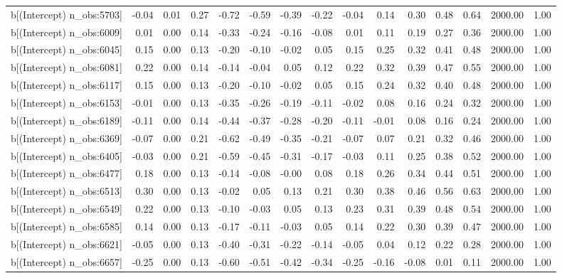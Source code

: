 \begin{table}[ht]
\begin{tabular}{rrrrrrrrrrrrrrr}
  b[(Intercept) n\_obs:5703] & -0.04 & 0.01 & 0.27 & -0.72 & -0.59 & -0.39 & -0.22 & -0.04 & 0.14 & 0.30 & 0.48 & 0.64 & 2000.00 & 1.00 \\ 
  b[(Intercept) n\_obs:6009] & 0.01 & 0.00 & 0.14 & -0.33 & -0.24 & -0.16 & -0.08 & 0.01 & 0.11 & 0.19 & 0.27 & 0.36 & 2000.00 & 1.00 \\ 
  b[(Intercept) n\_obs:6045] & 0.15 & 0.00 & 0.13 & -0.20 & -0.10 & -0.02 & 0.05 & 0.15 & 0.25 & 0.32 & 0.41 & 0.48 & 2000.00 & 1.00 \\ 
  b[(Intercept) n\_obs:6081] & 0.22 & 0.00 & 0.14 & -0.14 & -0.04 & 0.05 & 0.12 & 0.22 & 0.32 & 0.39 & 0.47 & 0.55 & 2000.00 & 1.00 \\ 
  b[(Intercept) n\_obs:6117] & 0.15 & 0.00 & 0.13 & -0.20 & -0.10 & -0.02 & 0.05 & 0.15 & 0.24 & 0.32 & 0.40 & 0.48 & 2000.00 & 1.00 \\ 
  b[(Intercept) n\_obs:6153] & -0.01 & 0.00 & 0.13 & -0.35 & -0.26 & -0.19 & -0.11 & -0.02 & 0.08 & 0.16 & 0.24 & 0.32 & 2000.00 & 1.00 \\ 
  b[(Intercept) n\_obs:6189] & -0.11 & 0.00 & 0.14 & -0.44 & -0.37 & -0.28 & -0.20 & -0.11 & -0.01 & 0.08 & 0.16 & 0.24 & 2000.00 & 1.00 \\ 
  b[(Intercept) n\_obs:6369] & -0.07 & 0.00 & 0.21 & -0.62 & -0.49 & -0.35 & -0.21 & -0.07 & 0.07 & 0.21 & 0.32 & 0.46 & 2000.00 & 1.00 \\ 
  b[(Intercept) n\_obs:6405] & -0.03 & 0.00 & 0.21 & -0.59 & -0.45 & -0.31 & -0.17 & -0.03 & 0.11 & 0.25 & 0.38 & 0.52 & 2000.00 & 1.00 \\ 
  b[(Intercept) n\_obs:6477] & 0.18 & 0.00 & 0.13 & -0.14 & -0.08 & -0.00 & 0.08 & 0.18 & 0.26 & 0.34 & 0.44 & 0.51 & 2000.00 & 1.00 \\ 
  b[(Intercept) n\_obs:6513] & 0.30 & 0.00 & 0.13 & -0.02 & 0.05 & 0.13 & 0.21 & 0.30 & 0.38 & 0.46 & 0.56 & 0.63 & 2000.00 & 1.00 \\ 
  b[(Intercept) n\_obs:6549] & 0.22 & 0.00 & 0.13 & -0.10 & -0.03 & 0.05 & 0.13 & 0.23 & 0.31 & 0.39 & 0.48 & 0.54 & 2000.00 & 1.00 \\ 
  b[(Intercept) n\_obs:6585] & 0.14 & 0.00 & 0.13 & -0.17 & -0.11 & -0.03 & 0.05 & 0.14 & 0.22 & 0.30 & 0.39 & 0.47 & 2000.00 & 1.00 \\ 
  b[(Intercept) n\_obs:6621] & -0.05 & 0.00 & 0.13 & -0.40 & -0.31 & -0.22 & -0.14 & -0.05 & 0.04 & 0.12 & 0.22 & 0.28 & 2000.00 & 1.00 \\ 
  b[(Intercept) n\_obs:6657] & -0.25 & 0.00 & 0.13 & -0.60 & -0.51 & -0.42 & -0.34 & -0.25 & -0.16 & -0.08 & 0.01 & 0.11 & 2000.00 & 1.00 \\ 

\end{tabular}
\end{table}
